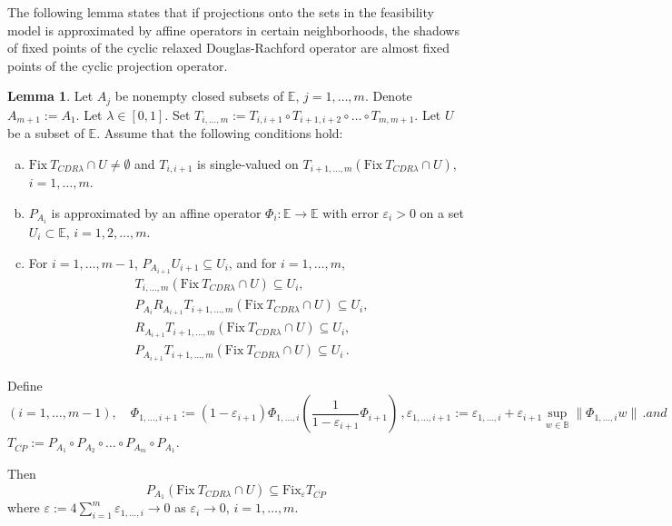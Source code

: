 \documentclass[12pt]{article}
\theoremstyle{definition}
\newtheorem{lemma}{Lemma}
\renewcommand{\equiv}{:=}
\newcommand{\Fix}{\mathrm{Fix}\ }
\newcommand{\Fixepsilon}{{\mathrm{Fix}_{\varepsilon} }}
\begin{document}
The following lemma states that if projections onto the sets in the feasibility model is approximated by affine operators in certain neighborhoods, the shadows of fixed points of the cyclic relaxed Douglas-Rachford operator are almost fixed points of the cyclic projection operator.
\begin{lemma}\label{lem:shadow.fixed.point.subset.CP.noise}
Let $A_j$ be nonempty closed subsets of $\mathbb E$, $j=1,\dots,m$.
Denote $A_{m+1}:=A_1$.
Let $\lambda\in[0,1]$.
Set $T_{i,\dots,m}\equiv T_{i,i+1}\circ T_{i+1,i+2}\circ\dots\circ T_{m,m+1}$.
Let $U$ be a subset of $\mathbb E$. 
Assume that the following conditions hold:
\begin{enumerate}[(a)]
    \item $\Fix T_{CDR\lambda}\cap U\neq\emptyset$ and  $T_{i,i+1}$ is single-valued on $T_{i+1,\dots,m}(\Fix T_{CDR\lambda}\cap U)$, $i=1,\dots,m$.
    \item $P_{A_i}$ is approximated by an affine operator $\Phi_i:\mathbb E\to \mathbb E$ with error $\varepsilon_i>0$ on a set $U_i\subset \mathbb E$, $i=1,2,\dots,m$.
    \item For $i=1,\dots,m-1$, $P_{A_{i+1}}U_{i+1}\subseteq U_i$, and for $i=1,\dots,m$,
\begin{equation}\label{eq:subset.Ui}
\begin{array}{rl}
&T_{i,\dots,m}(\Fix T_{CDR\lambda}\cap U)\subseteq U_i,\\
&P_{A_i}R_{A_{i+1}}T_{i+1,\dots,m}(\Fix T_{CDR\lambda}\cap U)\subseteq U_i,\\
&R_{A_{i+1}}T_{i+1,\dots,m}(\Fix T_{CDR\lambda}\cap U)\subseteq U_i,\\
&P_{A_{i+1}}T_{i+1,\dots,m}(\Fix T_{CDR\lambda}\cap U)\subseteq U_i\,.
\end{array}
\end{equation}
\end{enumerate}
Define
\begin{subequations}
\begin{equation}
(i=1,\dots,m-1),\quad \Phi_{1,\dots,i+1}\equiv(1-\varepsilon_{i+1})\Phi_{1,\dots,i}(\frac{1}{1-\varepsilon_{i+1}}\Phi_{i+1})\,,
\end{equation}
\begin{equation}
\varepsilon_{1,\dots,i+1}\equiv\varepsilon_{1,\dots,i}+\varepsilon_{i+1} \sup_{w\in\mathbb B}{\|\Phi_{1,\dots,i}w\|}\,.
\end{equation}
and
\end{subequations}
$T_{\overline{CP}}\equiv P_{A_1}\circ P_{A_2}\circ\dots\circ P_{A_{m}}\circ P_{A_1}$.

Then
\begin{equation}\label{eq:shadow.sunset.CP.noise}
    P_{A_1}(\Fix T_{CDR\lambda}\cap U)\subseteq \Fixepsilon T_{\overline{CP}}
\end{equation}
where $\varepsilon\equiv 4\sum_{i=1}^m \varepsilon_{1,\dots,i}\to 0$ as $\varepsilon_i\to 0$, $i=1,\dots,m$.
\end{lemma}
\end{document}
